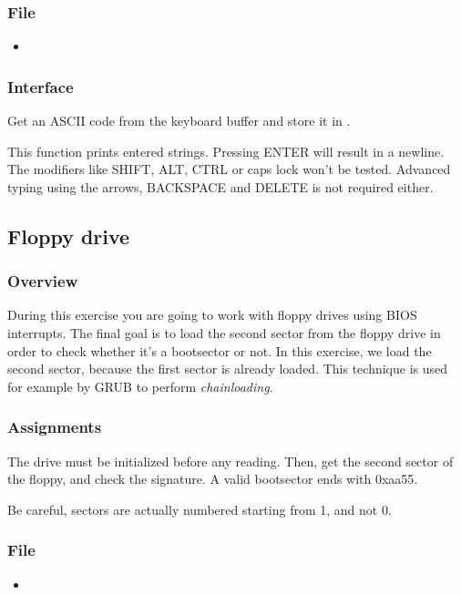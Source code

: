 \subsubsection*{File}
\begin{itemize}
  \item {}
\end{itemize}

\subsubsection*{Interface}
{
  Get an ASCII code from the keyboard buffer and store it in .
}

{
  This function prints entered strings. Pressing ENTER will result in a
  newline.
  The modifiers like SHIFT, ALT, CTRL or caps lock won't be tested. Advanced
  typing using the arrows, BACKSPACE and DELETE is not required either.
}

%
%

\newpage

\subsection{Floppy drive}

\subsubsection*{Overview}
During this exercise you are going to work with floppy drives using BIOS
interrupts. The final goal is to load the second sector from the floppy drive
in order to check whether it's a bootsector or not. In this exercise, we load the
second sector, because the first sector is already loaded. This technique is used
for example by GRUB to perform \emph{chainloading}.

\subsubsection*{Assignments}
The drive must be initialized before any reading. Then, get the second sector of
the floppy, and check the signature. A valid bootsector ends with 0xaa55.

Be careful, sectors are actually numbered starting from 1, and not 0.

\subsubsection*{File}
\begin{itemize}
  \item {}
\end{itemize}

